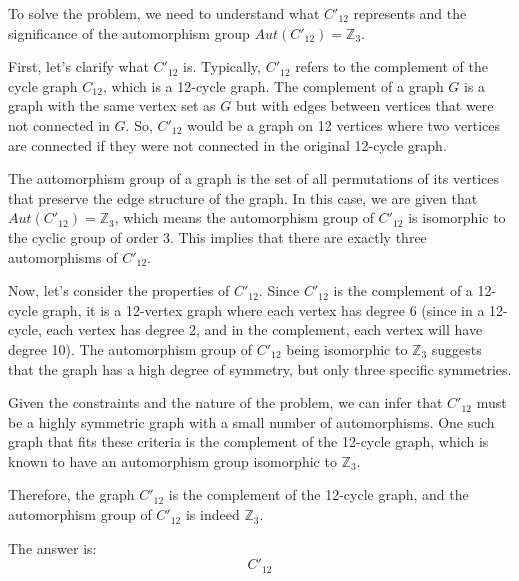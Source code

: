 To solve the problem, we need to understand what \( C'_{12} \) represents and the significance of the automorphism group \( Aut(C'_{12}) = \mathbb{Z}_3 \).

First, let's clarify what \( C'_{12} \) is. Typically, \( C'_{12} \) refers to the complement of the cycle graph \( C_{12} \), which is a 12-cycle graph. The complement of a graph \( G \) is a graph with the same vertex set as \( G \) but with edges between vertices that were not connected in \( G \). So, \( C'_{12} \) would be a graph on 12 vertices where two vertices are connected if they were not connected in the original 12-cycle graph.

The automorphism group of a graph is the set of all permutations of its vertices that preserve the edge structure of the graph. In this case, we are given that \( Aut(C'_{12}) = \mathbb{Z}_3 \), which means the automorphism group of \( C'_{12} \) is isomorphic to the cyclic group of order 3. This implies that there are exactly three automorphisms of \( C'_{12} \).

Now, let's consider the properties of \( C'_{12} \). Since \( C'_{12} \) is the complement of a 12-cycle graph, it is a 12-vertex graph where each vertex has degree 6 (since in a 12-cycle, each vertex has degree 2, and in the complement, each vertex will have degree 10). The automorphism group of \( C'_{12} \) being isomorphic to \( \mathbb{Z}_3 \) suggests that the graph has a high degree of symmetry, but only three specific symmetries.

Given the constraints and the nature of the problem, we can infer that \( C'_{12} \) must be a highly symmetric graph with a small number of automorphisms. One such graph that fits these criteria is the complement of the 12-cycle graph, which is known to have an automorphism group isomorphic to \( \mathbb{Z}_3 \).

Therefore, the graph \( C'_{12} \) is the complement of the 12-cycle graph, and the automorphism group of \( C'_{12} \) is indeed \( \mathbb{Z}_3 \).

The answer is:
\[
\boxed{C'_{12}}
\]